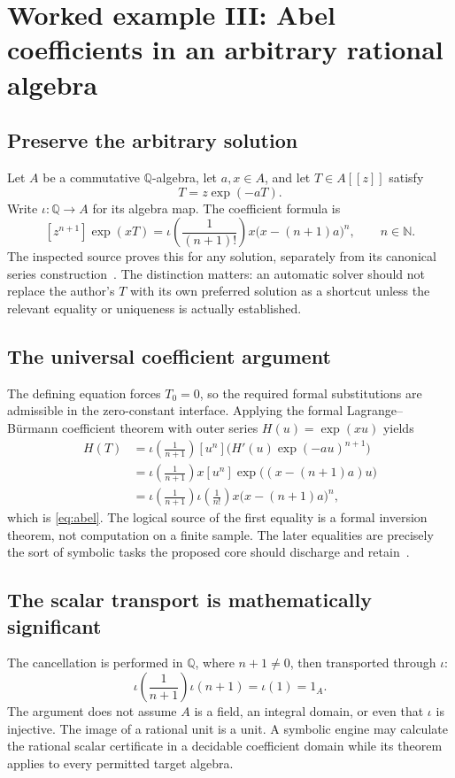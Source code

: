 \documentclass[11pt,a4paper]{article}
\newcommand{\N}{\mathbb N}
\newcommand{\Q}{\mathbb Q}
\theoremstyle{definition}
\begin{document}
\section{Worked example III: Abel coefficients in an arbitrary rational algebra}\label{sec:abel}

\subsection{Preserve the arbitrary solution}
Let \(A\) be a commutative \(\Q\)-algebra, let \(a,x\in A\), and let \(T\in A[[z]]\) satisfy
\[
            T=z\exp(-aT).
\]
Write \(\iota:\Q\to A\) for its algebra map. The coefficient formula is
\begin{equation}\label{eq:abel}
 [z^{n+1}]\exp(xT)
  =\iota\!\left(\frac1{(n+1)!}\right)
     x\bigl(x-(n+1)a\bigr)^n,
       \qquad n\in\N.
\end{equation}
The inspected source proves this for any solution, separately from its canonical series construction~\cite{pabel}. The distinction matters: an automatic solver should not replace the author's \(T\) with its own preferred solution as a shortcut unless the relevant equality or uniqueness is actually established.

\subsection{The universal coefficient argument}
The defining equation forces \(T_0=0\), so the required formal substitutions are admissible in the zero-constant interface. Applying the formal Lagrange--B\"urmann coefficient theorem with outer series \(H(u)=\exp(xu)\) yields
\begin{align*}
 [z^{n+1}]H(T)
 &=\iota\!\left(\frac1{n+1}\right)
     [u^n]\bigl(H'(u)\exp(-au)^{n+1}\bigr)\\
 &=\iota\!\left(\frac1{n+1}\right)x
     [u^n]\exp\bigl((x-(n+1)a)u\bigr)\\
 &=\iota\!\left(\frac1{n+1}\right)
     \iota\!\left(\frac1{n!}\right)
     x\bigl(x-(n+1)a\bigr)^n,
\end{align*}
which is \eqref{eq:abel}. The logical source of the first equality is a formal inversion theorem, not computation on a finite sample. The later equalities are precisely the sort of symbolic tasks the proposed core should discharge and retain~\cite{pabel}.

\subsection{The scalar transport is mathematically significant}
The cancellation is performed in \(\Q\), where \(n+1\ne0\), then transported through \(\iota\):
\[
 \iota\!\left(\frac1{n+1}\right)\iota(n+1)
    =\iota(1)=1_A.
\]
The argument does not assume \(A\) is a field, an integral domain, or even that \(\iota\) is injective. The image of a rational unit is a unit. A symbolic engine may calculate the rational scalar certificate in a decidable coefficient domain while its theorem applies to every permitted target algebra.
\end{document}
